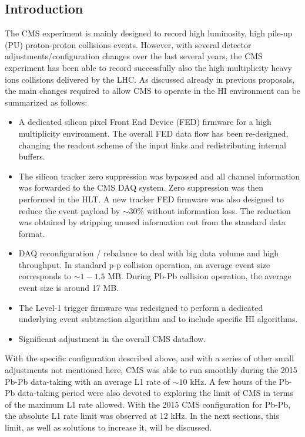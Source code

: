 \subsection{Introduction\label{subsec:HWintro}}
The CMS experiment is mainly designed to record high luminosity, high pile-up (PU) proton-proton collisions events.  However, with several detector adjustments/configuration changes over the last several years, the CMS experiment has been able to record successfully also the high multiplicity heavy ions collisions delivered by the LHC. As discussed already in previous
proposals, the main changes required to allow CMS to operate in the HI environment can be summarized as follows:

\begin{itemize}
\item A dedicated silicon pixel Front End Device (FED) firmware for a high multiplicity environment. The overall FED data flow has been re-designed, changing the readout scheme of the input links and redistributing internal buffers.
 
\item The silicon tracker zero suppression was bypassed and all channel information was forwarded to the CMS DAQ system. Zero suppression was then performed in the HLT. A new tracker FED firmware was also designed to reduce the event payload by $\sim 30 \%$ without information loss. The reduction was obtained by stripping unused information out from the standard data format.  

\item DAQ reconfiguration / rebalance to deal with big data volume and high throughput. In standard p-p collision operation, an average event size corresponds to $\sim 1-1.5$ MB. During Pb-Pb collision operation, the average event size is around 17 MB. 

\item The Level-1 trigger firmware was redesigned to perform a dedicated underlying event subtraction algorithm and to include specific HI algorithms.

\item Significant adjustment in the overall CMS dataflow.
\end{itemize}


With the specific configuration described above, and with a series of other small adjustments not mentioned here, CMS was able to run smoothly during the 2015 Pb-Pb data-taking with an average L1 rate of $\sim 10$ kHz. A few hours of the Pb-Pb data-taking
period were also devoted to exploring the limit of CMS in terms of the maximum L1 rate allowed.  With the 2015 CMS configuration for Pb-Pb, the absolute L1 rate limit was observed at 12 kHz. In the next sections, this limit, as well as solutions to increase it, will be discussed. 

